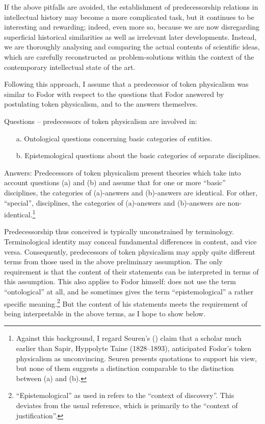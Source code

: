 \documentclass[output=paper]{langscibook}
\begin{document}
If the above pitfalls are avoided, the establishment of predecessorship relations in intellectual history may become a more complicated task, but it continues to be interesting and rewarding; indeed, even more so, because we are now disregarding superficial historical similarities as well as irrelevant later developments. Instead, we are thoroughly analysing and comparing the actual contents of scientific ideas, which are carefully reconstructed as problem-solutions within the context of the contemporary intellectual state of the art.\label{q:elffers:probsols}

Following this approach, I assume that a predecessor of token physicalism was similar to Fodor with respect to the questions that Fodor answered by postulating token physicalism, and to the answers themselves.

Questions -- predecessors of token physicalism are involved in:

\begin{enumerate}
    \item[a.] Ontological questions concerning basic categories of entities.
    \item[b.] Epistemological questions about the basic categories of separate disciplines.
\end{enumerate}

Answers: Predecessors of token physicalism present theories which take into account questions (a) and (b) and assume that for one or more ``basic'' disciplines, the categories of (a)-answers and (b)-answers are identical. For other, ``special'', disciplines, the categories of (a)-answers and (b)-answers are non-identical.\footnote{Against this background, I regard Seuren's (\citeyear[827--832]{Seuren2016}) claim that a scholar much earlier than Sapir, Hyppolyte Taine (1828--1893), anticipated Fodor's token physicalism as unconvincing. Seuren presents quotations to support his view, but none of them suggests a distinction comparable to the distinction between (a) and (b).}

Predecessorship thus conceived is typically unconstrained by terminology. Terminological identity may conceal fundamental differences in content, and vice versa. Consequently, predecessors of token physicalism may apply quite different terms from those used in the above preliminary assumption. The only requirement is that the content of their statements can be interpreted in terms of this assumption. This also applies to Fodor himself: \citet{Fodor1974} does not use the term ``ontological'' at all, and he sometimes gives the term ``epistemological'' a rather specific meaning.\footnote{``Epistemological'' as used in \citet[113]{Fodor1974} refers to the ``context of discovery''. This deviates from the usual reference, which is primarily to the ``context of justification''.\label{fn:elffers:6}} But the content of his statements meets the requirement of being interpretable in the above terms, as I hope to show below.
\end{document}
